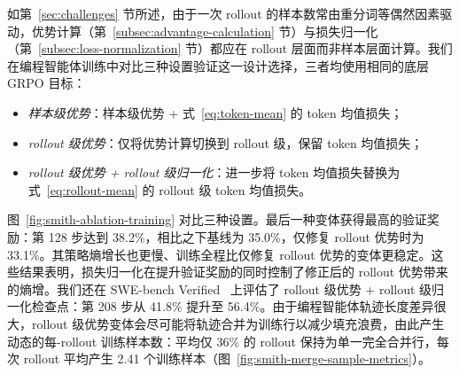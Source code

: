 如第~\ref{sec:challenges} 节所述，由于一次 rollout 的样本数常由重分词等偶然因素驱动，优势计算（第~\ref{subsec:advantage-calculation} 节）与损失归一化（第~\ref{subsec:loss-normalization} 节）都应在 rollout 层面而非样本层面计算。我们在编程智能体训练中对比三种设置验证这一设计选择，三者均使用相同的底层 GRPO 目标：
\begin{itemize}
  \item \emph{样本级优势}：样本级优势 + 式~\ref{eq:token-mean} 的 token 均值损失；
  \item \emph{rollout 级优势}：仅将优势计算切换到 rollout 级，保留 token 均值损失；
  \item \emph{rollout 级优势 + rollout 级归一化}：进一步将 token 均值损失替换为式~\ref{eq:rollout-mean} 的 rollout 级 token 均值损失。
\end{itemize}
图~\ref{fig:smith-ablation-training} 对比三种设置。最后一种变体获得最高的验证奖励：第 128 步达到 38.2\%，相比之下基线为 35.0\%，仅修复 rollout 优势时为 33.1\%。其策略熵增长也更慢、训练全程比仅修复 rollout 优势的变体更稳定。这些结果表明，损失归一化在提升验证奖励的同时控制了修正后的 rollout 优势带来的熵增。我们还在 SWE-bench Verified~\cite{swebench} 上评估了 rollout 级优势 + rollout 级归一化检查点：第 208 步从 41.8\% 提升至 56.4\%。由于编程智能体轨迹长度差异很大，rollout 级优势变体会尽可能将轨迹合并为训练行以减少填充浪费，由此产生动态的每-rollout 训练样本数：平均仅 36\% 的 rollout 保持为单一完全合并行，每次 rollout 平均产生 2.41 个训练样本（图~\ref{fig:smith-merge-sample-metrics}）。
